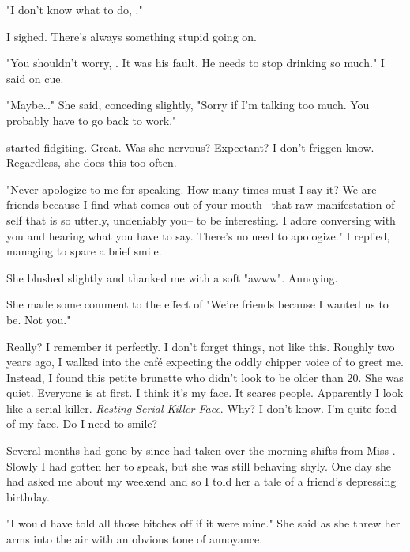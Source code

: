 "I don't know what to do, \josh."
\VV


\noindent
I sighed.  There's always something stupid going on.
\VV


"You shouldn't worry, \april.  It was his fault.
He needs to stop drinking so much." I said on cue.
\VV


"Maybe\ldots{}" She said, conceding slightly,
"Sorry if I'm talking too much.  You probably have to go back to work."
\VV


\noindent
\april{} started fidgiting.  Great.  Was she nervous?  Expectant?
I don't friggen know.  Regardless, she does this too often.
\VV


"Never apologize to me for speaking.  How many times must I say it?
We are friends because I find what comes out of your mouth--
that raw manifestation of self that is so utterly, undeniably you--
to be interesting.
I adore conversing with you and hearing what you have to say.
There's no need to apologize."
I replied, managing to spare a brief smile.
\VV


\noindent
She blushed slightly and thanked me with a soft "awww".  Annoying.
\VV


\noindent
She made some comment to the effect of
"We're friends because I wanted us to be.  Not you."
\VV


\noindent
Really?  I remember it perfectly.  I don't forget things, not like this.
Roughly two years ago, I walked into the caf\'e expecting the oddly chipper
voice of \emma{} to greet me.  Instead, I found this petite brunette who didn't
look to be older than 20.  She was quiet.  Everyone is at first.
I think it's my face.  It scares people.
Apparently I look like a serial killer.
\textit{Resting Serial Killer-Face}.
Why? I don't know.  I'm quite fond of my face.  Do I need to smile?


Several months had gone by since \april{} had taken over the morning shifts from
Miss \emma.  Slowly I had gotten her to speak, but she was still behaving
shyly.  One day she had asked me about my weekend and so I told her a tale
of a friend's depressing birthday.
\VV


"I would have told all those bitches off if it were mine."
She said as she threw her arms into the air with an obvious tone of annoyance.
\VV


